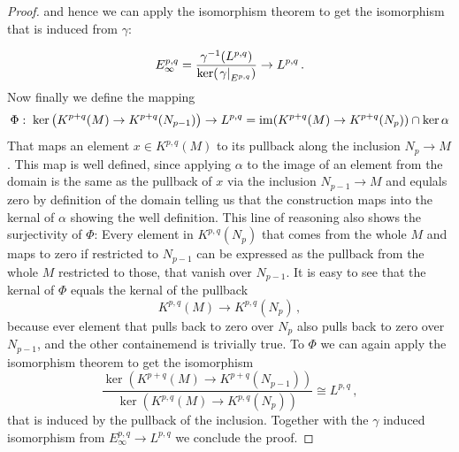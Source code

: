 \begin{proof}
	and hence we can apply the isomorphism theorem to get the isomorphism that is induced from $\gamma$:
	
	\begin{equation*}
		E^{p,q}_\infty=\frac{\gamma^{-1}(L^{p,q})}{\ker(\left.\gamma\right|_{E^{p,q}})} \to L^{p,q}\,.
	\end{equation*}
	Now finally we define the mapping
	\begin{equation*}
		\Phi:\;\ker \left(K^{p+q}(M)\to K^{p+q}(N_{p-1})\right) \to L^{p,q}
		=\mathrm{im}(K^{p+q}(M)\to K^{p+q}(N_p)) \cap \ker \alpha\\
	\end{equation*} That maps an element $x\in K^{p,q}(M)$ to its pullback along the inclusion $N_p\to M$. This map is well defined, since applying $\alpha$ to the image of an element from the domain is the same as the pullback of $x$ via the inclusion $N_{p-1}\to M$ and equlals zero by definition of the domain telling us that the construction maps into the kernal of $\alpha$ showing the well definition. This line of reasoning also shows the surjectivity of $\Phi$: Every element in $K^{p,q}(N_p)$ that comes from the whole $M$ and maps to zero if restricted to $N_{p-1}$ can be expressed as the pullback from the whole $M$ restricted to those, that vanish over $N_{p-1}$. It is easy to see that the kernal of $\Phi$ equals the kernal of the pullback
	\begin{equation*}
		K^{p,q}(M)\to K^{p,q}(N_p)\,,
	\end{equation*} because ever element that pulls back to zero over $N_p$ also pulls back to zero over $N_{p-1}$, and the other containemend is trivially true.
	To $\Phi$ we can again apply the isomorphism theorem to get the isomorphism
	\begin{equation*}
		\frac{\ker \left(K^{p+q}(M)\to K^{p+q}(N_{p-1})\right) }{\ker\left( K^{p,q}(M)\to K^{p,q}(N_p)\right)} \cong L^{p,q}\,,
	\end{equation*} that is induced by the pullback of the inclusion. Together with the $\gamma$ induced isomorphism from $E_\infty^{p,q}\to L^{p,q}$ we conclude the proof.
\end{proof}

